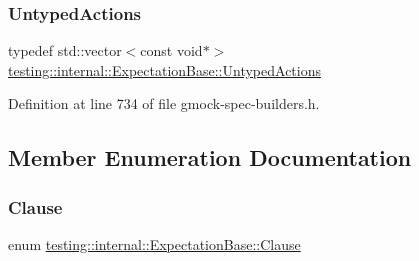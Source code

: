 \subsubsection{\texorpdfstring{Untyped\+Actions}{UntypedActions}}
{\footnotesize\ttfamily typedef std\+::vector$<$const void$\ast$$>$ \hyperlink{classtesting_1_1internal_1_1ExpectationBase_a9b21e82059961b9f1198d3f5d518254f}{testing\+::internal\+::\+Expectation\+Base\+::\+Untyped\+Actions}\hspace{0.3cm}{\ttfamily [protected]}}



Definition at line 734 of file gmock-\/spec-\/builders.\+h.



\subsection{Member Enumeration Documentation}
\mbox{\label{classtesting_1_1internal_1_1ExpectationBase_a450f34b979ec5814c91d4eab6b78cfc2}} 
\subsubsection{\texorpdfstring{Clause}{Clause}}
{\footnotesize\ttfamily enum \hyperlink{classtesting_1_1internal_1_1ExpectationBase_a450f34b979ec5814c91d4eab6b78cfc2}{testing\+::internal\+::\+Expectation\+Base\+::\+Clause}\hspace{0.3cm}{\ttfamily [protected]}}

